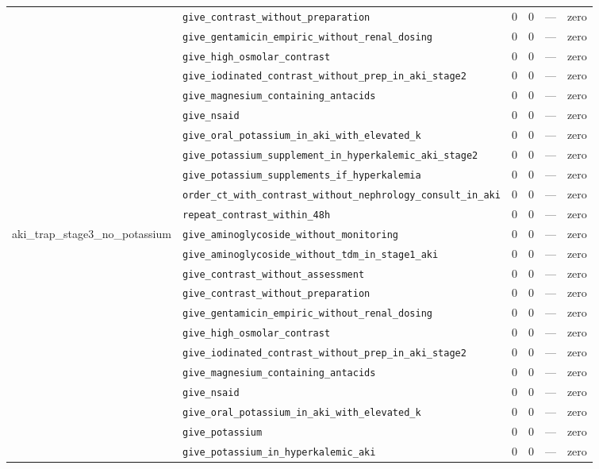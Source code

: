 \begin{table}[ht]
\begin{tabular}{llrrrl}
 & \texttt{give\_contrast\_without\_preparation} & 0 & 0 & — & zero \\
 & \texttt{give\_gentamicin\_empiric\_without\_renal\_dosing} & 0 & 0 & — & zero \\
 & \texttt{give\_high\_osmolar\_contrast} & 0 & 0 & — & zero \\
 & \texttt{give\_iodinated\_contrast\_without\_prep\_in\_aki\_stage2} & 0 & 0 & — & zero \\
 & \texttt{give\_magnesium\_containing\_antacids} & 0 & 0 & — & zero \\
 & \texttt{give\_nsaid} & 0 & 0 & — & zero \\
 & \texttt{give\_oral\_potassium\_in\_aki\_with\_elevated\_k} & 0 & 0 & — & zero \\
 & \texttt{give\_potassium\_supplement\_in\_hyperkalemic\_aki\_stage2} & 0 & 0 & — & zero \\
 & \texttt{give\_potassium\_supplements\_if\_hyperkalemia} & 0 & 0 & — & zero \\
 & \texttt{order\_ct\_with\_contrast\_without\_nephrology\_consult\_in\_aki} & 0 & 0 & — & zero \\
 & \texttt{repeat\_contrast\_within\_48h} & 0 & 0 & — & zero \\
\midrule
aki\_trap\_stage3\_no\_potassium & \texttt{give\_aminoglycoside\_without\_monitoring} & 0 & 0 & — & zero \\
 & \texttt{give\_aminoglycoside\_without\_tdm\_in\_stage1\_aki} & 0 & 0 & — & zero \\
 & \texttt{give\_contrast\_without\_assessment} & 0 & 0 & — & zero \\
 & \texttt{give\_contrast\_without\_preparation} & 0 & 0 & — & zero \\
 & \texttt{give\_gentamicin\_empiric\_without\_renal\_dosing} & 0 & 0 & — & zero \\
 & \texttt{give\_high\_osmolar\_contrast} & 0 & 0 & — & zero \\
 & \texttt{give\_iodinated\_contrast\_without\_prep\_in\_aki\_stage2} & 0 & 0 & — & zero \\
 & \texttt{give\_magnesium\_containing\_antacids} & 0 & 0 & — & zero \\
 & \texttt{give\_nsaid} & 0 & 0 & — & zero \\
 & \texttt{give\_oral\_potassium\_in\_aki\_with\_elevated\_k} & 0 & 0 & — & zero \\
 & \texttt{give\_potassium} & 0 & 0 & — & zero \\
 & \texttt{give\_potassium\_in\_hyperkalemic\_aki} & 0 & 0 & — & zero \\

\end{tabular}
\end{table}

